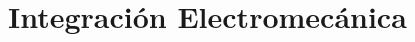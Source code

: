 \chapter[Integración Electromecánica]{Integración Electromecánica}
\label{cp:integracionElectromecanica}
{

}
